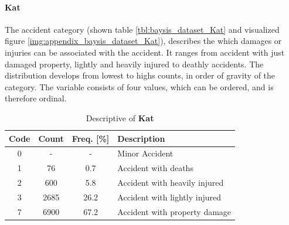 \paragraph{Kat}
The accident category (shown table \autoref{tbl:baysis_dataset_Kat} and visualized figure \autoref{img:appendix_baysis_dataset_Kat}), describes the which damages or injuries can be associated with the accident. It ranges from accident with just  damaged property, lightly and heavily injured to deathly accidents. The distribution develops from lowest to highs counts, in order of gravity of the category. The variable consists of four values, which can be ordered, and is therefore ordinal.
\begin{table}[!ht]
	\centering
	\small
	\begin{tabular}{c|c|c|l} 
		\toprule
		Code & Count & Freq. [\%] & Description \\ 
		\midrule
 		0 	& - 	& 	-	& Minor Accident  \\
 		1 	& 76 	& 0.7 	& Accident with deaths  \\ 
 		2 	& 600	& 5.8	& Accident with heavily injured  \\
 		3 	& 2685	& 26.2	& Accident with lightly injured  \\
		7 	& 6900	& 67.2	& Accident with property damage  \\
		\bottomrule
	\end{tabular}
	\caption{Descriptive of \textbf{Kat}}
	\label{tbl:baysis_dataset_Kat}
	\vspace{-8mm}
\end{table}

